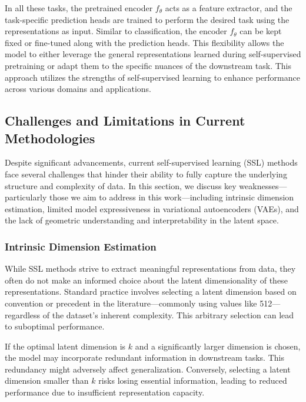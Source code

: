 In all these tasks, the pretrained encoder \( f_{\theta} \) acts as a feature extractor, and the task-specific prediction heads are trained to perform the desired task using the representations as input. Similar to classification, the encoder \( f_{\theta} \) can be kept fixed or fine-tuned along with the prediction heads. This flexibility allows the model to either leverage the general representations learned during self-supervised pretraining or adapt them to the specific nuances of the downstream task. This approach utilizes the strengths of self-supervised learning to enhance performance across various domains and applications.

\subsection{Challenges and Limitations in Current Methodologies}

Despite significant advancements, current self-supervised learning (SSL) methods face several challenges that hinder their ability to fully capture the underlying structure and complexity of data. In this section, we discuss key weaknesses—particularly those we aim to address in this work—including intrinsic dimension estimation, limited model expressiveness in variational autoencoders (VAEs), and the lack of geometric understanding and interpretability in the latent space.

\subsubsection{Intrinsic Dimension Estimation}

While SSL methods strive to extract meaningful representations from data, they often do not make an informed choice about the latent dimensionality of these representations. Standard practice involves selecting a latent dimension based on convention or precedent in the literature—commonly using values like 512—regardless of the dataset's inherent complexity. This arbitrary selection can lead to suboptimal performance.

If the optimal latent dimension is \( k \) and a significantly larger dimension is chosen, the model may incorporate redundant information in downstream tasks. This redundancy might adversely affect generalization. Conversely, selecting a latent dimension smaller than \( k \) risks losing essential information, leading to reduced performance due to insufficient representation capacity.

